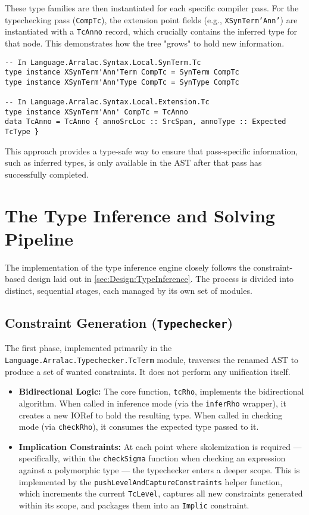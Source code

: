 These type families are then instantiated for each specific compiler pass. For the typechecking pass (\texttt{CompTc}), the extension point fields (e.g., \texttt{XSynTerm'Ann'}) are instantiated with a \texttt{TcAnno} record, which crucially contains the inferred type for that node. This demonstrates how the tree "grows" to hold new information.

\begin{verbatim}
-- In Language.Arralac.Syntax.Local.SynTerm.Tc
type instance XSynTerm'Ann'Term CompTc = SynTerm CompTc
type instance XSynTerm'Ann'Type CompTc = SynType CompTc

-- In Language.Arralac.Syntax.Local.Extension.Tc
type instance XSynTerm'Ann' CompTc = TcAnno
data TcAnno = TcAnno { annoSrcLoc :: SrcSpan, annoType :: Expected TcType }
\end{verbatim}

This approach provides a type-safe way to ensure that pass-specific information, such as inferred types, is only available in the AST after that pass has successfully completed.

\section{The Type Inference and Solving Pipeline}
\label{sec:Implementation:Pipeline}

The implementation of the type inference engine closely follows the constraint-based design laid out in \cref{sec:Design:TypeInference}. The process is divided into distinct, sequential stages, each managed by its own set of modules.

\subsection{Constraint Generation (\texttt{Typechecker})}
The first phase, implemented primarily in the \\ \texttt{Language.Arralac.Typechecker.TcTerm} module, traverses the renamed AST to produce a set of wanted constraints. It does not perform any unification itself.
\begin{itemize}
    \item \textbf{Bidirectional Logic:} The core function, \texttt{tcRho}, implements the bidirectional algorithm. When called in inference mode (via the \texttt{inferRho} wrapper), it creates a new IORef to hold the resulting type. When called in checking mode (via \texttt{checkRho}), it consumes the expected type passed to it.

    \item \textbf{Implication Constraints:} At each point where skolemization is required --- specifically, within the \texttt{checkSigma} function when checking an expression against a polymorphic type --- the typechecker enters a deeper scope. This is implemented by the \texttt{pushLevelAndCaptureConstraints} helper function, which increments the current \texttt{TcLevel}, captures all new constraints generated within its scope, and packages them into an \texttt{Implic} constraint.
\end{itemize}

